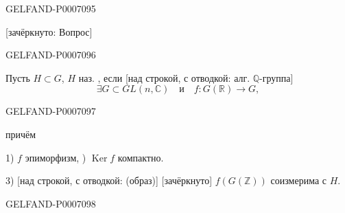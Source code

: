 \begin{GelfandAdjacentEvidence}{GELFAND-P000709}{5}


[зачёркнуто: Вопрос]
\end{GelfandAdjacentEvidence}
\begin{GelfandAdjacentEvidence}{GELFAND-P000709}{6}


Пусть \(H\subset G\), \(H\) наз. ,
если [над строкой, с отводкой: алг. \(\mathbb Q\)-группа]
\[
\exists G\subset GL(n,\mathbb C)\quad\text{и}\quad
f:G(\mathbb R)\longrightarrow G,
\]
\end{GelfandAdjacentEvidence}
\begin{GelfandAdjacentEvidence}{GELFAND-P000709}{7}


причём

1) \(f\) эпиморфизм, ) \(\operatorname{Ker} f\) компактно.

3) [над строкой, с отводкой: (образ)] [зачёркнуто]
\(f(G(\mathbb Z))\) соизмерима с \(H\).
\end{GelfandAdjacentEvidence}
\begin{GelfandAdjacentEvidence}{GELFAND-P000709}{8}

\end{GelfandAdjacentEvidence}



